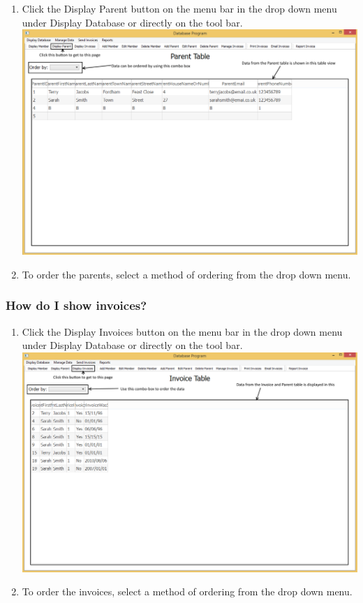 \begin{enumerate}
	\item Click the Display Parent button on the menu bar in the drop down menu under Display Database or directly on the tool bar.
\includegraphics[width=\textwidth]{./Manual/Images/ShowParent.png}
	\item To order the parents, select a method of ordering from the drop down menu.
\end{enumerate}


\subsubsection{How do I show invoices?}
\label{show_invoice}

\begin{enumerate}
	\item Click the Display Invoices button on the menu bar in the drop down menu under Display Database or directly on the tool bar.
\includegraphics[width=\textwidth]{./Manual/Images/ShowInvoice.png}
	\item To order the invoices, select a method of ordering from the drop down menu.
\end{enumerate}


